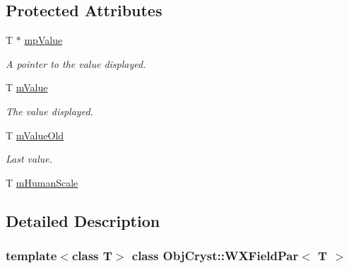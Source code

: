 \subsection*{Protected Attributes}
\begin{DoxyCompactItemize}
\item 
\mbox{\label{class_obj_cryst_1_1_w_x_field_par_ac9b8abe09a3c0b0f993aaa2f0e6c3022}} 
T $\ast$ \mbox{\hyperlink{class_obj_cryst_1_1_w_x_field_par_ac9b8abe09a3c0b0f993aaa2f0e6c3022}{mp\+Value}}
\begin{DoxyCompactList}\small\item\em A pointer to the value displayed. \end{DoxyCompactList}\item 
\mbox{\label{class_obj_cryst_1_1_w_x_field_par_a107a4db390c1dfad6b899f84b4930bcd}} 
T \mbox{\hyperlink{class_obj_cryst_1_1_w_x_field_par_a107a4db390c1dfad6b899f84b4930bcd}{m\+Value}}
\begin{DoxyCompactList}\small\item\em The value displayed. \end{DoxyCompactList}\item 
\mbox{\label{class_obj_cryst_1_1_w_x_field_par_a3d57d6853b52c00725f6148d8f509b21}} 
T \mbox{\hyperlink{class_obj_cryst_1_1_w_x_field_par_a3d57d6853b52c00725f6148d8f509b21}{m\+Value\+Old}}
\begin{DoxyCompactList}\small\item\em Last value. \end{DoxyCompactList}\item 
T \mbox{\hyperlink{class_obj_cryst_1_1_w_x_field_par_aa37ca90ca40304e967b232e3eef4af12}{m\+Human\+Scale}}
\end{DoxyCompactItemize}


\subsection{Detailed Description}
\subsubsection*{template$<$class T$>$\newline
class Obj\+Cryst\+::\+W\+X\+Field\+Par$<$ T $>$}

